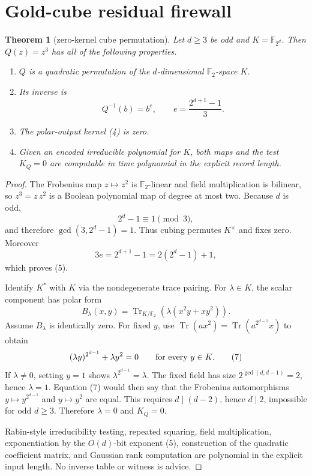 \documentclass[11pt]{article}
\newtheorem{theorem}{Theorem}
\newcommand{\F}{\mathbb F_2}
\begin{document}
\section{Gold-cube residual firewall}
\begin{theorem}[zero-kernel cube permutation]
Let $d\ge3$ be odd and $K=\mathbb F_{2^d}$.  Then $Q(z)=z^3$ has all of the
following properties.
\begin{enumerate}
\item $Q$ is a quadratic permutation of the $d$-dimensional $\F$-space $K$.
\item Its inverse is
\[
 Q^{-1}(b)=b^e,\qquad e=\frac{2^{d+1}-1}{3}.            \tag{5}
\]
\item The polar-output kernel (4) is zero.
\item Given an encoded irreducible polynomial for $K$, both maps and the
test $K_Q=0$ are computable in time polynomial in the explicit record length.
\end{enumerate}
\end{theorem}
\begin{proof}
The Frobenius map $z\mapsto z^2$ is $\F$-linear and field multiplication is
bilinear, so $z^3=z\,z^2$ is a Boolean polynomial map of degree at most two.
Because $d$ is odd,
\[
 2^d-1\equiv1\pmod3,
\]
and therefore $\gcd(3,2^d-1)=1$.  Thus cubing permutes $K^\times$ and fixes
zero.  Moreover
\[
 3e=2^{d+1}-1=2(2^d-1)+1,
\]
which proves (5).

Identify $K^*$ with $K$ via the nondegenerate trace pairing.  For
$\lambda\in K$, the scalar component has polar form
\[
 B_\lambda(x,y)
 =\operatorname{Tr}_{K/\F}\!\left(
   \lambda(x^2y+xy^2)\right).                           \tag{6}
\]
Assume $B_\lambda$ is identically zero.  For fixed $y$, use
$\operatorname{Tr}(a x^2)=\operatorname{Tr}(a^{2^{d-1}}x)$ to obtain
\[
 (\lambda y)^{2^{d-1}}+\lambda y^2=0
 \qquad\hbox{for every }y\in K.                        \tag{7}
\]
If $\lambda\ne0$, setting $y=1$ shows
$\lambda^{2^{d-1}}=\lambda$.  The fixed field has size
$2^{\gcd(d,d-1)}=2$, hence $\lambda=1$.  Equation (7) would then say that
the Frobenius automorphisms $y\mapsto y^{2^{d-1}}$ and $y\mapsto y^2$ are
equal.  This requires $d\mid(d-2)$, hence $d\mid2$, impossible for odd
$d\ge3$.  Therefore $\lambda=0$ and $K_Q=0$.

Rabin-style irreducibility testing, repeated squaring, field multiplication,
exponentiation by the $O(d)$-bit exponent (5), construction of the quadratic
coefficient matrix, and Gaussian rank computation are polynomial in the
explicit input length.  No inverse table or witness is advice.
\end{proof}
\end{document}
